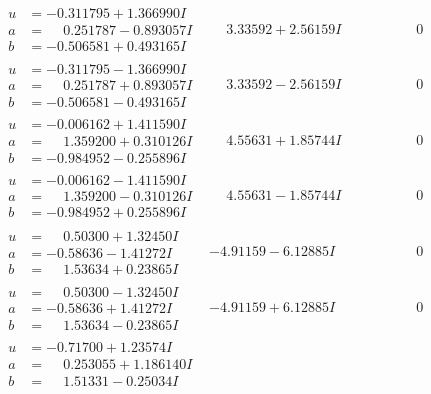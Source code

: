 \documentclass[1p]{elsarticle_modified}
\theoremstyle{definition}
\begin{document}
$$\begin{array}{c|c|c}
\begin{aligned}
u &= -0.311795 + 1.366990 I \\
a &= \phantom{-}0.251787 - 0.893057 I \\
b &= -0.506581 + 0.493165 I\end{aligned}
 & \phantom{-}3.33592 + 2.56159 I & \phantom{-0.000000 } 0 \\ \hline\begin{aligned}
u &= -0.311795 - 1.366990 I \\
a &= \phantom{-}0.251787 + 0.893057 I \\
b &= -0.506581 - 0.493165 I\end{aligned}
 & \phantom{-}3.33592 - 2.56159 I & \phantom{-0.000000 } 0 \\ \hline\begin{aligned}
u &= -0.006162 + 1.411590 I \\
a &= \phantom{-}1.359200 + 0.310126 I \\
b &= -0.984952 - 0.255896 I\end{aligned}
 & \phantom{-}4.55631 + 1.85744 I & \phantom{-0.000000 } 0 \\ \hline\begin{aligned}
u &= -0.006162 - 1.411590 I \\
a &= \phantom{-}1.359200 - 0.310126 I \\
b &= -0.984952 + 0.255896 I\end{aligned}
 & \phantom{-}4.55631 - 1.85744 I & \phantom{-0.000000 } 0 \\ \hline\begin{aligned}
u &= \phantom{-}0.50300 + 1.32450 I \\
a &= -0.58636 - 1.41272 I \\
b &= \phantom{-}1.53634 + 0.23865 I\end{aligned}
 & -4.91159 - 6.12885 I & \phantom{-0.000000 } 0 \\ \hline\begin{aligned}
u &= \phantom{-}0.50300 - 1.32450 I \\
a &= -0.58636 + 1.41272 I \\
b &= \phantom{-}1.53634 - 0.23865 I\end{aligned}
 & -4.91159 + 6.12885 I & \phantom{-0.000000 } 0 \\ \hline\begin{aligned}
u &= -0.71700 + 1.23574 I \\
a &= \phantom{-}0.253055 + 1.186140 I \\
b &= \phantom{-}1.51331 - 0.25034 I\end{aligned}

\end{array}$$
\end{document}
